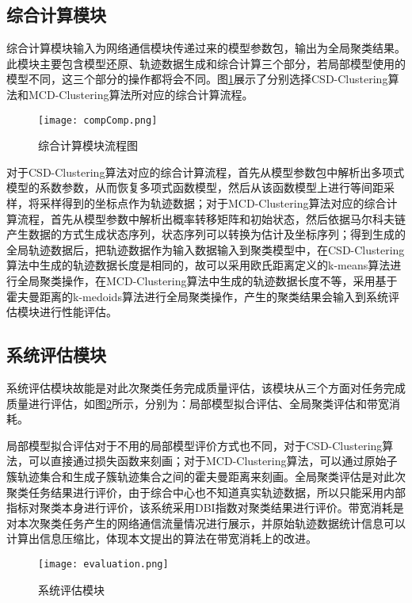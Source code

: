 \subsection{综合计算模块}

综合计算模块输入为网络通信模块传递过来的模型参数包，输出为全局聚类结果。此模块主要包含模型还原、轨迹数据生成和综合计算三个部分，若局部模型使用的模型不同，这三个部分的操作都将会不同。图\ref{compComp}展示了分别选择CSD-Clustering算法和MCD-Clustering算法所对应的综合计算流程。
\begin{figure}[h]
	\texttt{[image: compComp.png]}
	\caption{综合计算模块流程图}
	\label{compComp}
\end{figure}

对于CSD-Clustering算法对应的综合计算流程，首先从模型参数包中解析出多项式模型的系数参数，从而恢复多项式函数模型，然后从该函数模型上进行等间距采样，将采样得到的坐标点作为轨迹数据；对于MCD-Clustering算法对应的综合计算流程，首先从模型参数中解析出概率转移矩阵和初始状态，然后依据马尔科夫链产生数据的方式生成状态序列，状态序列可以转换为估计及坐标序列；得到生成的全局轨迹数据后，把轨迹数据作为输入数据输入到聚类模型中，在CSD-Clustering算法中生成的轨迹数据长度是相同的，故可以采用欧氏距离定义的k-means算法进行全局聚类操作，在MCD-Clustering算法中生成的轨迹数据长度不等，采用基于霍夫曼距离的k-medoids算法进行全局聚类操作，产生的聚类结果会输入到系统评估模块进行性能评估。

\subsection{系统评估模块}

系统评估模块故能是对此次聚类任务完成质量评估，该模块从三个方面对任务完成质量进行评估，如图\ref{evaluation}所示，分别为：局部模型拟合评估、全局聚类评估和带宽消耗。

局部模型拟合评估对于不用的局部模型评价方式也不同，对于CSD-Clustering算法，可以直接通过损失函数来刻画；对于MCD-Clustering算法，可以通过原始子簇轨迹集合和生成子簇轨迹集合之间的霍夫曼距离来刻画。全局聚类评估是对此次聚类任务结果进行评价，由于综合中心也不知道真实轨迹数据，所以只能采用内部指标对聚类本身进行评价，该系统采用DBI指数对聚类结果进行评价。带宽消耗是对本次聚类任务产生的网络通信流量情况进行展示，并原始轨迹数据统计信息可以计算出信息压缩比，体现本文提出的算法在带宽消耗上的改进。
\begin{figure}[h]
	\texttt{[image: evaluation.png]}
	\caption{系统评估模块}
	\label{evaluation}
\end{figure}


